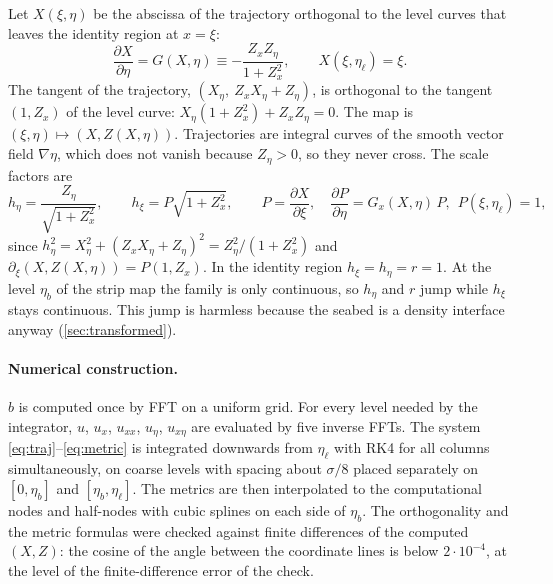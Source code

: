 \documentclass[11pt,a4paper]{article}
\theoremstyle{remark}
\newcommand{\etab}{\eta_{b}}
\newcommand{\etal}{\eta_{\ell}}
\newcommand{\pd}{\partial}
\begin{document}
Let $X(\xi,\eta)$ be the abscissa of the trajectory orthogonal to the level
curves that leaves the identity region at $x=\xi$:
\begin{equation}\label{eq:traj}
\frac{\pd X}{\pd\eta}=G(X,\eta)\equiv-\frac{Z_xZ_\eta}{1+Z_x^2},\qquad X(\xi,\etal)=\xi .
\end{equation}
The tangent of the trajectory, $(X_\eta,\ Z_xX_\eta+Z_\eta)$, is orthogonal to the
tangent $(1,Z_x)$ of the level curve:
$X_\eta(1+Z_x^2)+Z_xZ_\eta=0$. The map is $(\xi,\eta)\mapsto(X,Z(X,\eta))$.
Trajectories are integral curves of the smooth vector field $\nabla\eta$, which
does not vanish because $Z_\eta>0$, so they never cross. The scale factors are
\begin{equation}\label{eq:metric}
h_\eta=\frac{Z_\eta}{\sqrt{1+Z_x^2}},\qquad h_\xi=P\sqrt{1+Z_x^2},\qquad
P=\frac{\pd X}{\pd\xi},\quad \frac{\pd P}{\pd\eta}=G_x(X,\eta)\,P,\ \ P(\xi,\etal)=1,
\end{equation}
since $h_\eta^2=X_\eta^2+(Z_xX_\eta+Z_\eta)^2=Z_\eta^2/(1+Z_x^2)$ and
$\pd_\xi(X,Z(X,\eta))=P(1,Z_x)$. In the identity region $h_\xi=h_\eta=r=1$. At the
level $\etab$ of the strip map the family is only continuous, so $h_\eta$ and
$r$ jump while $h_\xi$ stays continuous. This jump is harmless because the
seabed is a density interface anyway (\cref{sec:transformed}).

\paragraph{Numerical construction.} $\hat b$ is computed once by FFT on a
uniform grid. For every level needed by the integrator, $u$, $u_x$, $u_{xx}$,
$u_\eta$, $u_{x\eta}$ are evaluated by five inverse FFTs. The system
\eqref{eq:traj}--\eqref{eq:metric} is integrated downwards from $\etal$ with
RK4 for all columns simultaneously, on coarse levels with spacing about
$\sigma/8$ placed separately on $[0,\etab]$ and $[\etab,\etal]$. The metrics are
then interpolated to the computational nodes and half-nodes with cubic splines
on each side of $\etab$. The orthogonality and the metric formulas were checked
against finite differences of the computed $(X,Z)$: the cosine of the angle
between the coordinate lines is below $2\cdot10^{-4}$, at the level of the
finite-difference error of the check.
\end{document}
